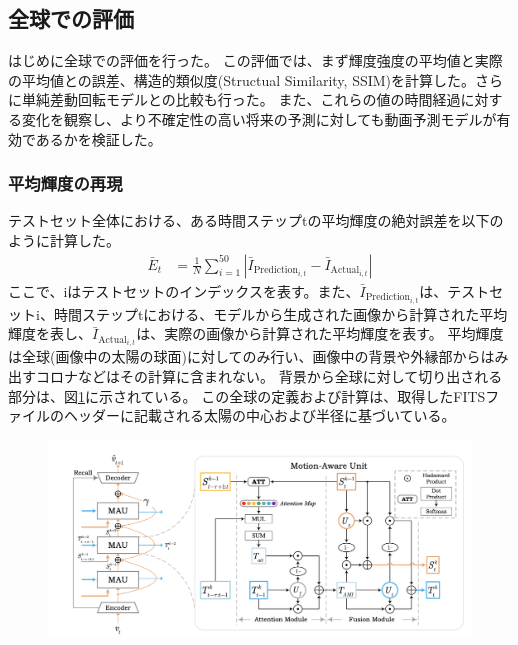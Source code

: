     \subsection{全球での評価}
      はじめに全球での評価を行った。
      この評価では、まず輝度強度の平均値と実際の平均値との誤差、構造的類似度(Structual Similarity, SSIM)を計算した。さらに単純差動回転モデルとの比較も行った。
      また、これらの値の時間経過に対する変化を観察し、より不確定性の高い将来の予測に対しても動画予測モデルが有効であるかを検証した。
      
      \subsubsection{平均輝度の再現}
        テストセット全体における、ある時間ステップtの平均輝度の絶対誤差を以下のように計算した。
        \begin{align}
          \bar{E}_{t} & = \frac{1}{N} \sum_{i=1}^{50} | \bar{I}_{\text{Prediction}_{i,t}} - \bar{I}_{\text{Actual}_{i,t}} |
        \end{align}
        ここで、iはテストセットのインデックスを表す。また、\( \bar{I}_{\text{Prediction}_{i,t}} \)は、テストセットi、時間ステップtにおける、モデルから生成された画像から計算された平均輝度を表し、\( \bar{I}_{\text{Actual}_{i,t}} \)は、実際の画像から計算された平均輝度を表す。
        平均輝度は全球(画像中の太陽の球面)に対してのみ行い、画像中の背景や外縁部からはみ出すコロナなどはその計算に含まれない。
        背景から全球に対して切り出される部分は、図\ref{fig:exp1_fulldisk_crop}に示されている。
        この全球の定義および計算は、取得したFITSファイルのヘッダーに記載される太陽の中心および半径に基づいている。

        \begin{figure}[h]
          \centering
          \includegraphics[width=150mm]{figures/mau.png}
          \caption{}
          \label{fig:exp1_fulldisk_crop}
        \end{figure}

